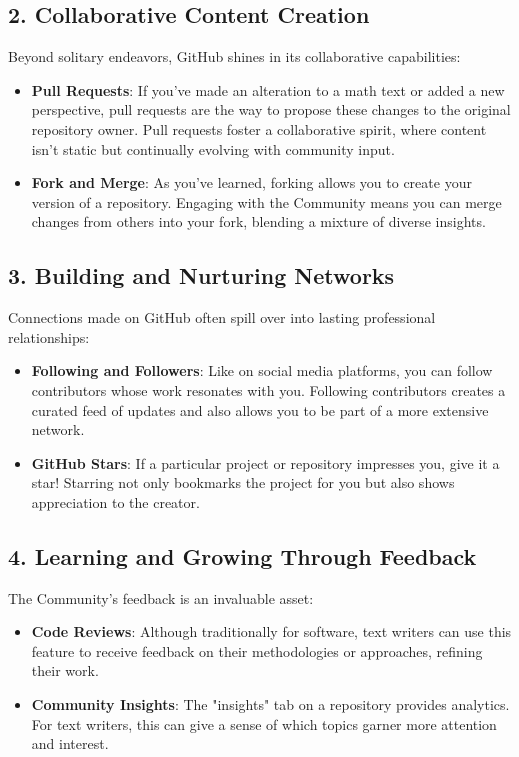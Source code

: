 \documentclass[a4paper,12pt]{book}
\begin{document}
\subsection*{2. Collaborative Content Creation}
Beyond solitary endeavors, GitHub shines in its collaborative capabilities:

\begin{itemize}
    \item \textbf{Pull Requests}: If you've made an alteration to a math text or added a new perspective, pull requests are the way to propose these changes to the original repository owner. Pull requests foster a collaborative spirit, where content isn't static but continually evolving with community input.
    \item \textbf{Fork and Merge}: As you've learned, forking allows you to create your version of a repository. Engaging with the Community means you can merge changes from others into your fork, blending a mixture of diverse insights.
\end{itemize}

\subsection*{3. Building and Nurturing Networks}
Connections made on GitHub often spill over into lasting professional relationships:

\begin{itemize}
    \item \textbf{Following and Followers}: Like on social media platforms, you can follow contributors whose work resonates with you. Following contributors creates a curated feed of updates and also allows you to be part of a more extensive network.
    \item \textbf{GitHub Stars}: If a particular project or repository impresses you, give it a star! Starring not only bookmarks the project for you but also shows appreciation to the creator.
\end{itemize}

\subsection*{4. Learning and Growing Through Feedback}
The Community's feedback is an invaluable asset:

\begin{itemize}
    \item \textbf{Code Reviews}: Although traditionally for software, text writers can use this feature to receive feedback on their methodologies or approaches, refining their work.
    \item \textbf{Community Insights}: The "insights" tab on a repository provides analytics. For text writers, this can give a sense of which topics garner more attention and interest.
\end{itemize}
\end{document}
